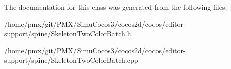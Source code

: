 The documentation for this class was generated from the following files\+:\begin{DoxyCompactItemize}
\item 
/home/pmx/git/\+P\+M\+X/\+Simu\+Cocos3/cocos2d/cocos/editor-\/support/spine/Skeleton\+Two\+Color\+Batch.\+h\item 
/home/pmx/git/\+P\+M\+X/\+Simu\+Cocos3/cocos2d/cocos/editor-\/support/spine/Skeleton\+Two\+Color\+Batch.\+cpp\end{DoxyCompactItemize}
